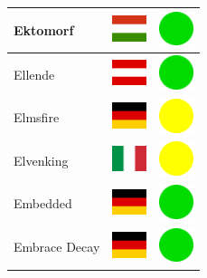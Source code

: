\documentclass[12pt, a4paper, twoside]{report}
\begin{document}
\begin{center}
\begin{longtable}{|p{5cm}|p{2cm}|p{2cm}|}
 Ektomorf                                                   & \includegraphics[width=1cm]{../img/flags/hu} &   \includegraphics[width=1cm]{../likes/y} \\ \hline
 Ellende                                                    & \includegraphics[width=1cm]{../img/flags/at} &   \includegraphics[width=1cm]{../likes/y} \\ \hline
 Elmsfire                                                   & \includegraphics[width=1cm]{../img/flags/de} &   \includegraphics[width=1cm]{../likes/m} \\ \hline
 Elvenking                                                  & \includegraphics[width=1cm]{../img/flags/it} &   \includegraphics[width=1cm]{../likes/m} \\ \hline
 Embedded                                                   & \includegraphics[width=1cm]{../img/flags/de} &   \includegraphics[width=1cm]{../likes/y} \\ \hline
 Embrace Decay                                              & \includegraphics[width=1cm]{../img/flags/de} &   \includegraphics[width=1cm]{../likes/y} \\ \hline

\end{longtable}
\end{center}
\end{document}
